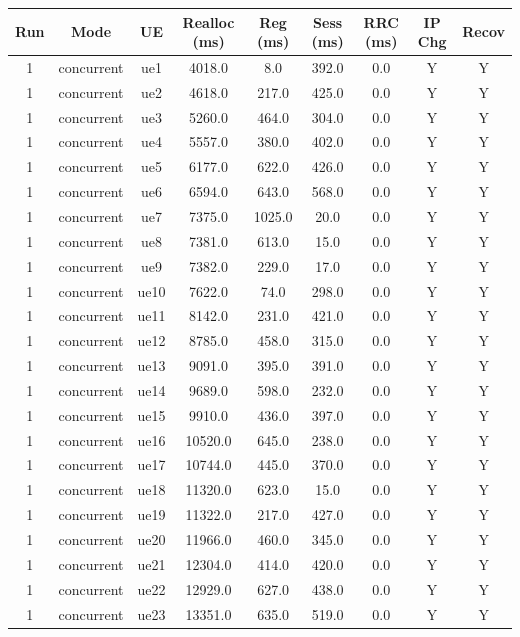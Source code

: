 \begin{table}[ht]
\centering
\begin{tabular}{|c|c|c|c|c|c|c|c|c|}
\hline
Run & Mode & UE & Realloc (ms) & Reg (ms) & Sess (ms) & RRC (ms) & IP Chg & Recov \\
\hline
1 & concurrent & ue1 & 4018.0 & 8.0 & 392.0 & 0.0 & Y & Y \\
1 & concurrent & ue2 & 4618.0 & 217.0 & 425.0 & 0.0 & Y & Y \\
1 & concurrent & ue3 & 5260.0 & 464.0 & 304.0 & 0.0 & Y & Y \\
1 & concurrent & ue4 & 5557.0 & 380.0 & 402.0 & 0.0 & Y & Y \\
1 & concurrent & ue5 & 6177.0 & 622.0 & 426.0 & 0.0 & Y & Y \\
1 & concurrent & ue6 & 6594.0 & 643.0 & 568.0 & 0.0 & Y & Y \\
1 & concurrent & ue7 & 7375.0 & 1025.0 & 20.0 & 0.0 & Y & Y \\
1 & concurrent & ue8 & 7381.0 & 613.0 & 15.0 & 0.0 & Y & Y \\
1 & concurrent & ue9 & 7382.0 & 229.0 & 17.0 & 0.0 & Y & Y \\
1 & concurrent & ue10 & 7622.0 & 74.0 & 298.0 & 0.0 & Y & Y \\
1 & concurrent & ue11 & 8142.0 & 231.0 & 421.0 & 0.0 & Y & Y \\
1 & concurrent & ue12 & 8785.0 & 458.0 & 315.0 & 0.0 & Y & Y \\
1 & concurrent & ue13 & 9091.0 & 395.0 & 391.0 & 0.0 & Y & Y \\
1 & concurrent & ue14 & 9689.0 & 598.0 & 232.0 & 0.0 & Y & Y \\
1 & concurrent & ue15 & 9910.0 & 436.0 & 397.0 & 0.0 & Y & Y \\
1 & concurrent & ue16 & 10520.0 & 645.0 & 238.0 & 0.0 & Y & Y \\
1 & concurrent & ue17 & 10744.0 & 445.0 & 370.0 & 0.0 & Y & Y \\
1 & concurrent & ue18 & 11320.0 & 623.0 & 15.0 & 0.0 & Y & Y \\
1 & concurrent & ue19 & 11322.0 & 217.0 & 427.0 & 0.0 & Y & Y \\
1 & concurrent & ue20 & 11966.0 & 460.0 & 345.0 & 0.0 & Y & Y \\
1 & concurrent & ue21 & 12304.0 & 414.0 & 420.0 & 0.0 & Y & Y \\
1 & concurrent & ue22 & 12929.0 & 627.0 & 438.0 & 0.0 & Y & Y \\
1 & concurrent & ue23 & 13351.0 & 635.0 & 519.0 & 0.0 & Y & Y \\

\end{tabular}
\end{table}
